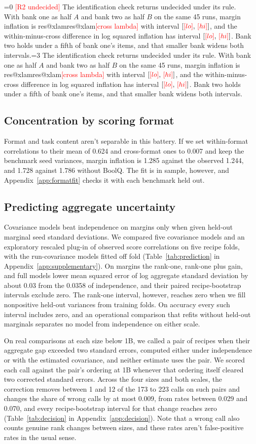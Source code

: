 \documentclass{article}
\makeatletter
\newcommand{\ci}[2]{\ensuremath{[#1,\,#2]}}
\newcommand{\pending}[1]{\textcolor{red}{[#1]}}
\newcommand{\Rtwocase}{0}
\newcommand{\outcome}[4]{\ifnum#1=0 \pending{#3} #4\else\ifnum#1=#2 #4\fi\fi}
\newcommand{\res}[2]{\ifcsname res@#1\endcsname\csname res@#1\endcsname\else\pending{#2}\fi}
\makeatother
\begin{document}
\outcome{\Rtwocase}{3}{R2 undecided}{The identification check returns undecided under its rule. With bank one as half $A$ and bank two as half $B$ on the same 45 runs, margin inflation is \res{xlam}{cross lambda} with interval \ci{\res{xlo}{lo}}{\res{xhi}{hi}}, and the within-minus-cross difference in log squared inflation has interval \ci{\res{dlo}{lo}}{\res{dhi}{hi}}. Bank two holds under a fifth of bank one's items, and that smaller bank widens both intervals.}

\subsection{Concentration by scoring format}
Format and task content aren't separable in this battery. If we set within-format correlations to their mean of 0.624 and cross-format ones to 0.007 and keep the benchmark seed variances, margin inflation is 1.285 against the observed 1.244, and 1.728 against 1.786 without BoolQ. The fit is in sample, however, and Appendix~\ref{app:formatfit} checks it with each benchmark held out.

\subsection{Predicting aggregate uncertainty}
\label{sec:prediction}
Covariance models beat independence on margins only when given held-out marginal seed standard deviations. We compared five covariance models and an exploratory rescaled plug-in of observed score correlations on five recipe folds, with the run-covariance models fitted off fold (Table~\ref{tab:prediction} in Appendix~\ref{app:supplementary}). On margins the rank-one, rank-one plus gain, and full models lower mean squared error of log aggregate standard deviation by about 0.03 from the 0.0358 of independence, and their paired recipe-bootstrap intervals exclude zero. The rank-one interval, however, reaches zero when we fill nonpositive held-out variances from training folds. On accuracy every such interval includes zero, and an operational comparison that refits without held-out marginals separates no model from independence on either scale.

On real comparisons at each size below 1B, we called a pair of recipes when their aggregate gap exceeded two standard errors, computed either under independence or with the estimated covariance, and neither estimate uses the pair. We scored each call against the pair's ordering at 1B whenever that ordering itself cleared two corrected standard errors. Across the four sizes and both scales, the correction removes between 1 and 12 of the 173 to 223 calls on such pairs and changes the share of wrong calls by at most 0.009, from rates between 0.029 and 0.070, and every recipe-bootstrap interval for that change reaches zero (Table~\ref{tab:decision} in Appendix~\ref{app:decision}). Note that a wrong call also counts genuine rank changes between sizes, and these rates aren't false-positive rates in the usual sense.
\end{document}
